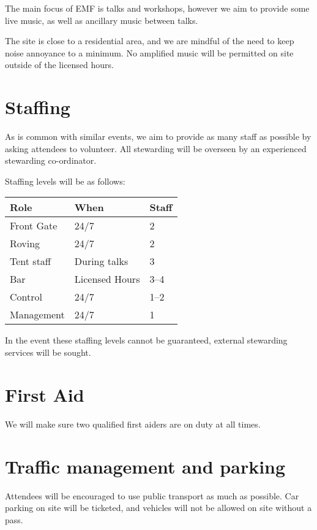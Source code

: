 The main focus of EMF is talks and workshops, however we aim to provide some live music,
as well as ancillary music between talks.

The site is close to a residential area, and we are mindful of the need to keep noise annoyance to a minimum.
No amplified music will be permitted on site outside of the licensed hours.

\section{Staffing}

As is common with similar events, we aim to provide as many staff as possible
by asking attendees to volunteer. All stewarding will be overseen by an experienced stewarding co-ordinator.

Staffing levels will be as follows:

\begin{tabular}{ l l l }
Role & When & Staff \\
\hline
Front Gate & 24/7 & 2 \\
Roving & 24/7 & 2 \\
Tent staff & During talks & 3 \\
Bar & Licensed Hours & 3--4 \\
Control & 24/7 & 1--2 \\
Management & 24/7 & 1
\end{tabular}

In the event these staffing levels cannot be guaranteed, external stewarding services will be sought.

\section{First Aid}

We will make sure two qualified first aiders are on duty at all times.

\section{Traffic management and parking}

Attendees will be encouraged to use public transport as much as possible. Car parking on site will be ticketed,
and vehicles will not be allowed on site without a pass.

